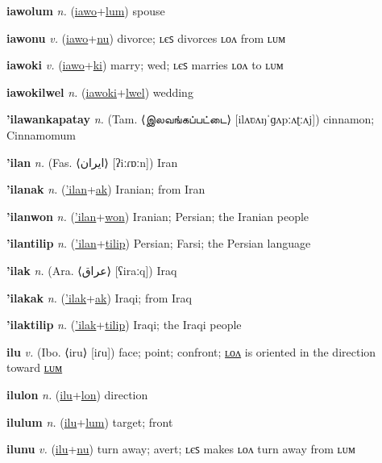 \textbf{\hypertarget{iawolum}{iawolum}} \textit{n.} (\hyperlink{iawo}{iawo}+\allowbreak \hyperlink{lum}{lum})
spouse

\textbf{\hypertarget{iawonu}{iawonu}} \textit{v.} (\hyperlink{iawo}{iawo}+\allowbreak \hyperlink{nu}{nu})
divorce; ʟєꜱ divorces ʟᴏᴧ from ʟᴜᴍ

\textbf{\hypertarget{iawoki}{iawoki}} \textit{v.} (\hyperlink{iawo}{iawo}+\allowbreak \hyperlink{ki}{ki})
marry; wed; ʟєꜱ marries ʟᴏᴧ to ʟᴜᴍ

\textbf{\hypertarget{iawokilwel}{iawokilwel}} \textit{n.} (\hyperlink{iawoki}{iawoki}+\allowbreak \hyperlink{lwel}{lwel})
wedding

\textbf{\hypertarget{'ilawankapatay}{'ilawankapatay}} \textit{n.} (Tam. ⟨{\tamil{}இலவங்கப்பட்டை}⟩ [ilʌʋʌŋˈɡʌpːʌʈːʌj])
cinnamon; Cinnamomum

\textbf{\hypertarget{'ilan}{'ilan}} \textit{n.} (Fas. ⟨{\arabics{}ایران‎}⟩ [ʔiːɾɒːn])
Iran

\textbf{\hypertarget{'ilanak}{'ilanak}} \textit{n.} (\hyperlink{'ilan}{'ilan}+\allowbreak \hyperlink{ak}{ak})
Iranian; from Iran

\textbf{\hypertarget{'ilanwon}{'ilanwon}} \textit{n.} (\hyperlink{'ilan}{'ilan}+\allowbreak \hyperlink{won}{won})
Iranian; Persian; the Iranian people

\textbf{\hypertarget{'ilantilip}{'ilantilip}} \textit{n.} (\hyperlink{'ilan}{'ilan}+\allowbreak \hyperlink{tilip}{tilip})
Persian; Farsi; the Persian language

\textbf{\hypertarget{'ilak}{'ilak}} \textit{n.} (Ara. ⟨{\arabics{}عراق}⟩ [ʕiraːq])
Iraq

\textbf{\hypertarget{'ilakak}{'ilakak}} \textit{n.} (\hyperlink{'ilak}{'ilak}+\allowbreak \hyperlink{ak}{ak})
Iraqi; from Iraq

\textbf{\hypertarget{'ilaktilip}{'ilaktilip}} \textit{n.} (\hyperlink{'ilak}{'ilak}+\allowbreak \hyperlink{tilip}{tilip})
Iraqi; the Iraqi people

\textbf{\hypertarget{ilu}{ilu}} \textit{v.} (Ibo. ⟨iru⟩ [iɾu])
face; point; confront; \hyperlink{ilulon}{ʟᴏᴧ} is oriented in the direction toward \hyperlink{ilulum}{ʟᴜᴍ}

\textbf{\hypertarget{ilulon}{ilulon}} \textit{n.} (\hyperlink{ilu}{ilu}+\allowbreak \hyperlink{lon}{lon})
direction

\textbf{\hypertarget{ilulum}{ilulum}} \textit{n.} (\hyperlink{ilu}{ilu}+\allowbreak \hyperlink{lum}{lum})
target; front

\textbf{\hypertarget{ilunu}{ilunu}} \textit{v.} (\hyperlink{ilu}{ilu}+\allowbreak \hyperlink{nu}{nu})
turn away; avert; ʟєꜱ makes ʟᴏᴧ turn away from ʟᴜᴍ

